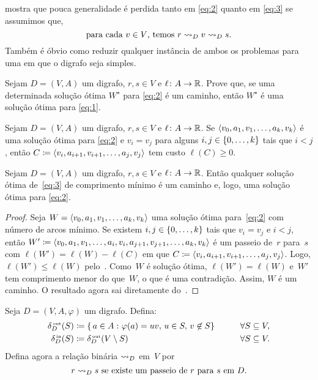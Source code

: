 \documentclass[10pt,reqno]{amsart}
\begin{document}
 mostra que pouca generalidade é perdida tanto em
\eqref{eq:2} quanto em \eqref{eq:3} se assumimos que,
\begin{equation}
  \label{eq:4}
  \text{para cada \(v \in V\), temos \(r \reaches_D v \reaches_D s\).}
\end{equation}
Também é óbvio como reduzir qualquer instância de ambos os problemas para
uma em que o digrafo seja simples.

\begin{exercise}
  \label{ex:2}
  Sejam \(D = (V,A)\) um digrafo, \(r,s \in V\) e
  \(\ell \colon A \to \mathbb{R}\).  Prove que, se uma determinada solução
  ótima \(W^\star\) para \eqref{eq:2} é um caminho, então \(W^\star\) é uma
  solução ótima para \eqref{eq:1}.
\end{exercise}

\begin{exercise}
  \label{ex:3}
  Sejam \(D = (V,A)\) um digrafo, \(r,s \in V\) e
  \(\ell \colon A \to \mathbb{R}\). Se
  \(\langle v_0,a_1,v_1,\dotsc,a_k,v_k\rangle\) é uma solução ótima
  para \eqref{eq:2} e \(v_i = v_j\) para alguns
  \(i,j \in \{0,\dotsc,k\}\) tais que \(i < j\), então
  \(C \coloneqq \langle v_i,a_{i+1},v_{i+1},\dotsc,a_j,v_j\rangle\) tem custo
  \(\ell(C) \geq 0\).
\end{exercise}

\begin{proposition}
  \label{prop:1}
  Sejam \(D = (V,A)\) um digrafo, \(r,s \in V\) e
  \(\ell \colon A \to \mathbb{R}\). Então qualquer solução ótima
  de~\eqref{eq:3} de comprimento mínimo é um caminho e, logo, uma
  solução ótima para \eqref{eq:2}.
\end{proposition}
\begin{proof}
  Seja \(W = \langle v_0,a_1,v_1,\dotsc,a_k,v_k\rangle\) uma solução ótima
  para~\eqref{eq:2} com número de arcos mínimo. Se existem
  \(i,j \in \{0,\dotsc,k\}\) tais que \(v_i = v_j\) e \(i < j\),
  então \(W' \coloneqq
  \langle v_0,a_1,v_1,\dotsc,a_i,v_i,a_{j+1},v_{j+1},\dotsc,a_k,v_k\rangle\) é
  um passeio de~\(r\) para~\(s\) com \(\ell(W') = \ell(W) - \ell(C)\) em que
  \(C \coloneqq \langle v_i,a_{i+1},v_{i+1},\dotsc,a_j,v_j\rangle\). Logo,
  \(\ell(W') \leq \ell(W)\) pelo~.  Como~\(W\) é solução ótima,
  \(\ell(W') = \ell(W)\) e~\(W'\) tem comprimento menor do que~\(W\), o que
  é uma contradição. Assim, \(W\) é um caminho.  O resultado agora sai
  diretamente do~.
\end{proof}

Seja \(D = (V,A,\varphi)\) um digrafo.  Defina:
\begin{alignat*}{2}
  \label{eq:5}
  \deltaout[D](S) & \coloneqq
  \setst{ a \in A }{ \varphi(a) = uv,\, u \in S,\, v \not\in S}
  & \qquad & \forall S \subseteq V,
  \\
  \deltain[D](S) & \coloneqq \deltaout[D](V \setminus S)
  & \qquad & \forall S \subseteq V.
\end{alignat*}
Defina agora a relação binária \(\rightsquigarrow_D\) em~\(V\) por
\begin{equation*}
  r \rightsquigarrow_D s
  \text{ se existe um passeio de~\(r\) para~\(s\) em~\(D\)}.
\end{equation*}
\end{document}

